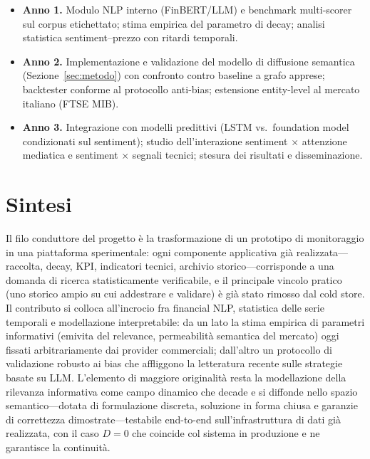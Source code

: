 \documentclass[a4paper,11pt]{article}
\begin{document}
\begin{itemize}\setlength\itemsep{0.15em}
  \item \textbf{Anno 1.} Modulo NLP interno (FinBERT/LLM) e benchmark multi-scorer sul corpus etichettato; stima empirica del parametro di decay; analisi statistica sentiment--prezzo con ritardi temporali.
  \item \textbf{Anno 2.} Implementazione e validazione del modello di diffusione semantica (Sezione~\ref{sec:metodo}) con confronto contro baseline a grafo apprese; backtester conforme al protocollo anti-bias; estensione entity-level al mercato italiano (FTSE MIB).
  \item \textbf{Anno 3.} Integrazione con modelli predittivi (LSTM vs.\ foundation model condizionati sul sentiment); studio dell'interazione sentiment $\times$ attenzione mediatica e sentiment $\times$ segnali tecnici; stesura dei risultati e disseminazione.
\end{itemize}

\section{Sintesi}

Il filo conduttore del progetto è la trasformazione di un prototipo di monitoraggio in una piattaforma sperimentale: ogni componente applicativa già realizzata---raccolta, decay, KPI, indicatori tecnici, archivio storico---corrisponde a una domanda di ricerca statisticamente verificabile, e il principale vincolo pratico (uno storico ampio su cui addestrare e validare) è già stato rimosso dal cold store. Il contributo si colloca all'incrocio fra financial NLP, statistica delle serie temporali e modellazione interpretabile: da un lato la stima empirica di parametri informativi (emivita del relevance, permeabilità semantica del mercato) oggi fissati arbitrariamente dai provider commerciali; dall'altro un protocollo di validazione robusto ai bias che affliggono la letteratura recente sulle strategie basate su LLM. L'elemento di maggiore originalità resta la modellazione della rilevanza informativa come campo dinamico che decade e si diffonde nello spazio semantico---dotata di formulazione discreta, soluzione in forma chiusa e garanzie di correttezza dimostrate---testabile end-to-end sull'infrastruttura di dati già realizzata, con il caso $D=0$ che coincide col sistema in produzione e ne garantisce la continuità.

\printbibliography
\end{document}
